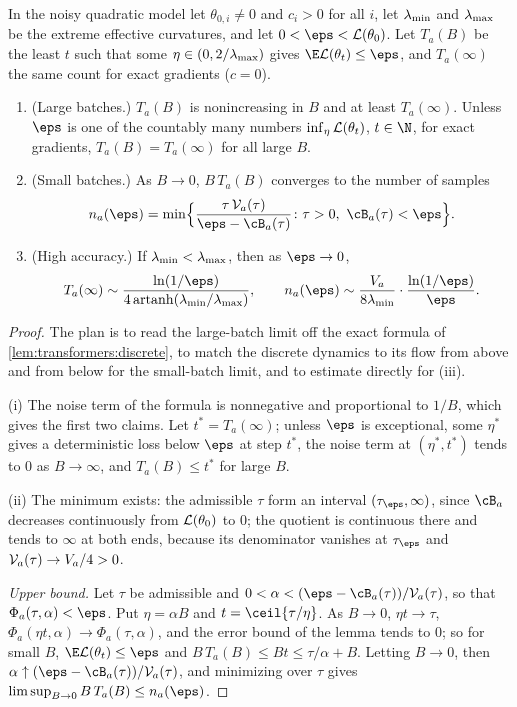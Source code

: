 \begin{refsection}
\begin{theorem}\label{thm:transformers:batch}
In the noisy quadratic model let $\theta_{0,i}\ne0$ and $c_i>0$ for all $i$, let $\lambda_{\min}$ and $\lambda_{\max}$ be the extreme effective curvatures, and let $0<\eps<\Loss(\theta_0)$. Let $T_a(B)$ be the least $t$ such that some $\eta\in(0,2/\lambda_{\max})$ gives $\E\Loss(\theta_t)\le\eps$, and $T_a(\infty)$ the same count for exact gradients ($c=0$).
\begin{enumerate}
\item (Large batches.) $T_a(B)$ is nonincreasing in $B$ and at least $T_a(\infty)$. Unless $\eps$ is one of the countably many numbers $\inf_\eta\mathcal{L}(\theta_t)$, $t\in\N$, for exact gradients, $T_a(B)=T_a(\infty)$ for all large $B$.
\item (Small batches.) As $B\to0$, $B\,T_a(B)$ converges to the number of samples
\[
  n_a(\eps)=\min\Bigl\{\frac{\tau\,\cV_a(\tau)}{\eps-\cB_a(\tau)}\colon\tau>0,\ \cB_a(\tau)<\eps\Bigr\}.
\]
\item (High accuracy.) If $\lambda_{\min}<\lambda_{\max}$, then as $\eps\to0$,
\[
  T_a(\infty)\sim\frac{\ln(1/\eps)}{4\operatorname{artanh}(\lmin/\lmax)},\qquad n_a(\eps)\sim\frac{V_a}{8\lmin}\cdot\frac{\ln(1/\eps)}\eps .
\]
\end{enumerate}
\end{theorem}

\begin{proof}
The plan is to read the large-batch limit off the exact formula of \cref{lem:transformers:discrete}, to match the discrete dynamics to its flow from above and from below for the small-batch limit, and to estimate directly for (iii).

(i) The noise term of the formula is nonnegative and proportional to $1/B$, which gives the first two claims. Let $t^*=T_a(\infty)$; unless $\eps$ is exceptional, some $\eta^*$ gives a deterministic loss below $\eps$ at step $t^*$, the noise term at $(\eta^*,t^*)$ tends to $0$ as $B\to\infty$, and $T_a(B)\le t^*$ for large $B$.

(ii) The minimum exists: the admissible $\tau$ form an interval $(\tau_\eps,\infty)$, since $\cB_a$ decreases continuously from $\mathcal{L}(\theta_0)$ to $0$; the quotient is continuous there and tends to $\infty$ at both ends, because its denominator vanishes at $\tau_\eps$ and $\mathcal{V}_a(\tau)\to V_a/4>0$.

\emph{Upper bound.} Let $\tau$ be admissible and $0<\alpha<(\eps-\cB_a(\tau))/\cV_a(\tau)$, so that $\Phi_a(\tau,\alpha)<\eps$. Put $\eta=\alpha B$ and $t=\ceil{\tau/\eta}$. As $B\to0$, $\eta t\to\tau$, $\Phi_a(\eta t,\alpha)\to\Phi_a(\tau,\alpha)$, and the error bound of the lemma tends to $0$; so for small $B$, $\E\Loss(\theta_t)\le\eps$ and $B\,T_a(B)\le Bt\le\tau/\alpha+B$. Letting $B\to0$, then $\alpha\uparrow(\eps-\cB_a(\tau))/\cV_a(\tau)$, and minimizing over $\tau$ gives $\limsup_{B\to0}B\,T_a(B)\le n_a(\eps)$.


\end{proof}
\end{refsection}
